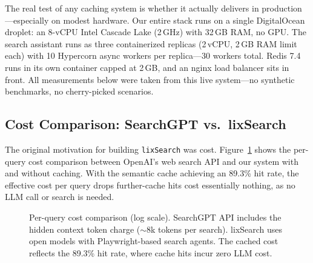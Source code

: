 \documentclass[conference]{IEEEtran}
\begin{document}
The real test of any caching system is whether it actually delivers in production---especially on modest hardware. Our entire stack runs on a single DigitalOcean droplet: an 8-vCPU Intel Cascade Lake (2\,GHz) with 32\,GB RAM, no GPU. The search assistant runs as three containerized replicas (2\,vCPU, 2\,GB RAM limit each) with 10 Hypercorn async workers per replica---30 workers total. Redis 7.4 runs in its own container capped at 2\,GB, and an nginx load balancer sits in front. All measurements below were taken from this live system---no synthetic benchmarks, no cherry-picked scenarios.

\subsection{Cost Comparison: SearchGPT vs.\ lixSearch}

The original motivation for building \texttt{lixSearch} was cost. Figure~\ref{fig:cost} shows the per-query cost comparison between OpenAI's web search API and our system with and without caching. With the semantic cache achieving an 89.3\% hit rate, the effective cost per query drops further-cache hits cost essentially nothing, as no LLM call or search is needed.

\begin{figure}[h]
\centering
{}
\caption{Per-query cost comparison (log scale). SearchGPT API includes the hidden context token charge (${\sim}$8k tokens per search). lixSearch uses open models with Playwright-based search agents. The cached cost reflects the 89.3\% hit rate, where cache hits incur zero LLM cost.}
\label{fig:cost}
\end{figure}
\end{document}
